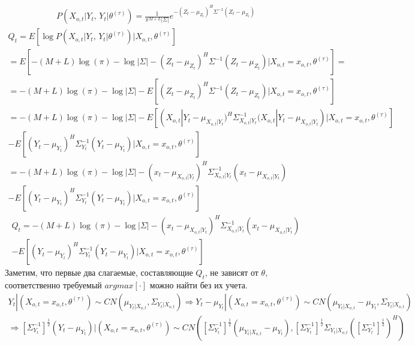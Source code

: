 \documentclass[11pt]{article}
\begin{document}
\begin{gather}
P(X_{o,t}|Y_t, \, Y_t|\theta^{(\tau)}) = \frac{1}{\pi^{M+L}|\Sigma|}e^{-(Z_t-\mu_{Z_t})^H\Sigma^{-1}(Z_t-\mu_{Z_t})}
\end{gather}
\begin{gather*}
Q_t = E[\log P(X_{o,t}|Y_t, \, Y_t|\theta^{(\tau)})|X_{o,t}, \theta^{(\tau)}] \\ = E[-(M+L)\log(\pi)-\log|\Sigma|-(Z_t-\mu_{Z_t})^H\Sigma^{-1}(Z_t-\mu_{Z_t})|X_{o,t}=x_{o,t}, \theta^{(\tau)}] = \\
=-(M+L)\log(\pi)-\log|\Sigma| - E[(Z_t-\mu_{Z_t})^H\Sigma^{-1}(Z_t-\mu_{Z_t})|X_{o,t}=x_{o,t}, \theta^{(\tau)}] \\
=-(M+L)\log(\pi)-\log|\Sigma|  -   E[(X_{o,t}|Y_t-\mu_{X_{o,t}|Y_t})^H\Sigma_{X_{o,t}|Y_t}^{-1}(X_{o,t}|Y_t-\mu_{X_{o,t}|Y_t})|X_{o,t}=x_{o,t}, \theta^{(\tau)}] 
\\- E[(Y_t-\mu_{Y_t})^H\Sigma_{Y_t}^{-1}(Y_t-\mu_{Y_t})|X_{o,t}=x_{o,t}, \theta^{(\tau)}] \\
=-(M+L)\log(\pi)-\log|\Sigma| - (x_t-\mu_{X_{o,t}|Y_t})^H\Sigma_{X_{o,t}|Y_t}^{-1}(x_t-\mu_{X_{o,t}|Y_t})\\ - E[(Y_t-\mu_{Y_t})^H\Sigma_{Y_t}^{-1}(Y_t-\mu_{Y_t})|X_{o,t}=x_{o,t},\theta^{(\tau)}] 
\end{gather*}
\begin{equation}
\begin{gathered}
Q_t = -(M+L)\log(\pi)-\log|\Sigma| - (x_t-\mu_{X_{o,t}|Y_t})^H\Sigma_{X_{o,t}|Y_t}^{-1}(x_t-\mu_{X_{o,t}|Y_t}) \\ - E[(Y_t-\mu_{Y_t})^H\Sigma_{Y_t}^{-1}(Y_t-\mu_{Y_t})|X_{o,t}=x_{o,t},\theta^{(\tau)}] 
\end{gathered}
\end{equation}
Заметим, что первые два слагаемые, составляющие $Q_t$, не зависят от $\theta$, соответственно требуемый $argmax [\cdot]$ можно найти без их учета.
\begin{gather*}
Y_t|(X_{o,t}=x_{o,t}, \theta^{(\tau)}) \sim CN(\mu_{Y_t|X_{o,t}}, \Sigma_{Y_t|X_{o,t}}) \Rightarrow Y_t-\mu_{Y_t}|(X_{o,t}=x_{o,t}, \theta^{(\tau)}) \sim CN(\mu_{Y_t|X_{o,t}}-\mu_{Y_t}, \Sigma_{Y_t|X_{o,t}})
\end{gather*}
\begin{gather*}
\Rightarrow [\Sigma_{Y_t}^{-1}]^{\frac{1}{2}}( Y_t-\mu_{Y_t})|(X_{o,t}=x_{o,t}, \theta^{(\tau)}) \sim CN([\Sigma_{Y_t}^{-1}]^{\frac{1}{2}}(\mu_{Y_t|X_{o,t}}-\mu_{Y_t}),[\Sigma_{Y_t}^{-1}]^{\frac{1}{2}} \Sigma_{Y_t|X_{o,t}}([\Sigma_{Y_t}^{-1}]^{\frac{1}{2}})^H)
\end{gather*}
\end{document}
